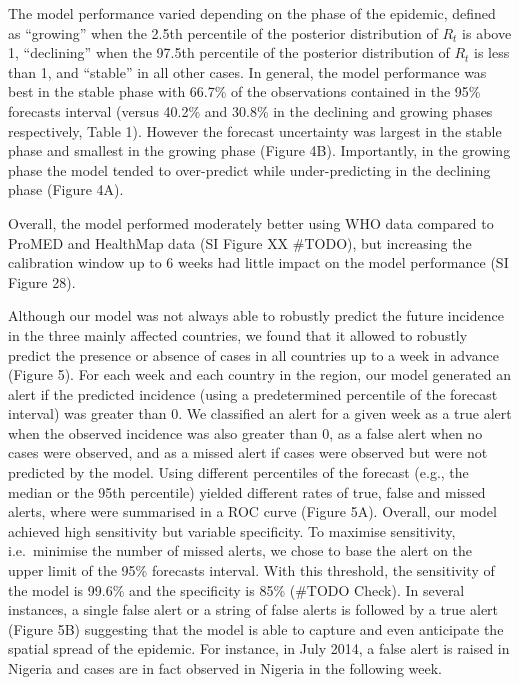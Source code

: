 \documentclass[9pt,twocolumn,twoside,lineno]{pnas-new}
\begin{document}

The model performance varied depending on the
phase of the epidemic, defined as ``growing'' when the
2.5th percentile of the posterior distribution of \(R_t\) is above 1,
``declining'' when the 97.5th percentile of the posterior distribution
of \(R_t\) is less than 1, and ``stable'' in all other cases. In
general, the model performance was best in the stable phase with
66.7\% of the observations contained in the 95\% forecasts interval
(versus 40.2\% and 30.8\% in the declining and growing phases respectively,
Table 1). However the forecast uncertainty was largest in the stable
phase and smallest in the growing phase (Figure 4B).
Importantly, in the growing phase the model tended to over-predict
while under-predicting in the declining phase (Figure 4A).

Overall, the model performed moderately better using WHO data compared
to ProMED and HealthMap data (SI Figure XX #TODO), but increasing the calibration window
up to 6 weeks had little impact on the model performance (SI Figure
28).

Although our model was not always able to robustly predict the future
incidence in the three mainly affected countries, we found that it
allowed to robustly predict the
presence or absence of cases in all countries up to a week in advance
(Figure 5). For each week and each country in the region, our model
generated an alert if the predicted incidence (using a predetermined
percentile of the forecast interval) was greater than 0. We classified
an alert for a given week as a true
alert when the observed incidence was also greater than 0, as a false
alert when no cases were observed, and as a missed alert if cases were
observed but were not predicted by the model. Using different
percentiles of the forecast (e.g., the median or the 95th percentile)
yielded different rates of true, false and missed alerts, where were
summarised in a ROC curve (Figure 5A). Overall, our model achieved
high sensitivity but variable specificity.
To maximise sensitivity, i.e.~minimise the number of missed
alerts, we chose to base the alert on the upper limit of the 95\%
forecasts interval. With this threshold, the sensitivity of the model is
99.6\% and the specificity is 85\% (#TODO Check). In several instances, a single false
alert or a string of false alerts is followed by a true alert (Figure
5B) suggesting that the model is able to capture and even anticipate the
spatial spread of the epidemic. For instance, in July 2014, a false
alert is raised in Nigeria and cases are in fact observed in Nigeria in
the following week.
\end{document}
